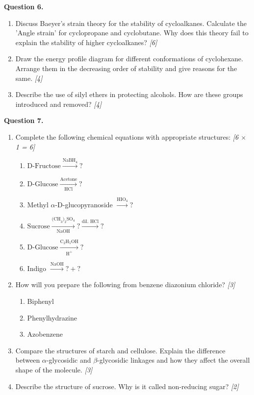\documentclass[11pt,a4paper]{article}
\newcommand{\pts}[1]{\hfill \textit{[#1]}}
\begin{document}
\bigskip

\noindent \textbf{Question 6.}
\begin{enumerate}[label=(\alph*)]
  \item Discuss Baeyer's strain theory for the stability of cycloalkanes. Calculate the 'Angle strain' for cyclopropane and cyclobutane. Why does this theory fail to explain the stability of higher cycloalkanes? \pts{6}
  \item Draw the energy profile diagram for different conformations of cyclohexane. Arrange them in the decreasing order of stability and give reasons for the same. \pts{4}
  \item Describe the use of silyl ethers in protecting alcohols. How are these groups introduced and removed? \pts{4}
\end{enumerate}

\bigskip

\noindent \textbf{Question 7.}
\begin{enumerate}[label=(\alph*)]
  \item Complete the following chemical equations with appropriate structures: \pts{6 $\times$ 1 = 6}
  \begin{enumerate}[label=(\roman*)]
    \item $\text{D-Fructose} \xrightarrow{\text{NaBH}_4} ?$
    \item $\text{D-Glucose} \xrightarrow[\text{HCl}]{\text{Acetone}} ?$
    \item Methyl $\alpha$-D-glucopyranoside $\xrightarrow{\text{HIO}_4} ?$
    \item $\text{Sucrose} \xrightarrow[\text{NaOH}]{\text{(CH}_3\text{)}_2\text{SO}_4} ? \xrightarrow{\text{dil. HCl}} ?$
    \item $\text{D-Glucose} \xrightarrow[\text{H}^+]{\text{C}_2\text{H}_5\text{OH}} ?$
    \item Indigo $\xrightarrow{\text{NaOH}} ? + ?$
  \end{enumerate}
  \item How will you prepare the following from benzene diazonium chloride? \pts{3}
  \begin{enumerate}[label=(\roman*)]
    \item Biphenyl
    \item Phenylhydrazine
    \item Azobenzene
  \end{enumerate}
  \item Compare the structures of starch and cellulose. Explain the difference between $\alpha$-glycosidic and $\beta$-glycosidic linkages and how they affect the overall shape of the molecule. \pts{3}
  \item Describe the structure of sucrose. Why is it called non-reducing sugar? \pts{2}
\end{enumerate}
\end{document}

